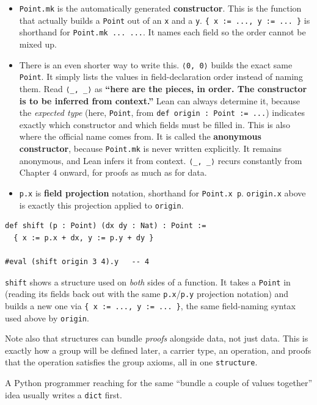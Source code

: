 \begin{itemize}
\tightlist
\item
  \texttt{Point.mk} is the automatically generated \textbf{constructor}. This is the function that actually builds a \texttt{Point} out of an \texttt{x} and a \texttt{y}. \texttt{\{ x := ..., y := ... \}} is shorthand for \texttt{Point.mk ... ...}. It names each field so the order cannot be mixed up.
\item
  There is an even shorter way to write this. \texttt{⟨0, 0⟩} builds the exact same \texttt{Point}. It simply lists the values in field-declaration order instead of naming them. Read \texttt{⟨\_\allowbreak{}, \_\allowbreak{}⟩} as \textbf{``here are the pieces, in order. The constructor is to be inferred from context.''} Lean can always determine it, because the \emph{expected type} (here, \texttt{Point}, from \texttt{def origin : Point := ...}) indicates exactly which constructor and which fields must be filled in. This is also where the official name comes from. It is called the \textbf{anonymous constructor}, because \texttt{Point.mk} is never written explicitly. It remains anonymous, and Lean infers it from context. \texttt{⟨\_\allowbreak{}, \_\allowbreak{}⟩} recurs constantly from Chapter 4 onward, for proofs as much as for data.
\item
  \texttt{p.x} is \textbf{field projection} notation, shorthand for \texttt{Point.x p}. \texttt{origin.x} above is exactly this projection applied to \texttt{origin}.
\end{itemize}

\begin{lstlisting}
def shift (p : Point) (dx dy : Nat) : Point :=
  { x := p.x + dx, y := p.y + dy }

#eval (shift origin 3 4).y   -- 4
\end{lstlisting}

\texttt{shift} shows a structure used on \emph{both} sides of a function. It takes a \texttt{Point} in (reading its fields back out with the same \texttt{p.x}/\texttt{p.y} projection notation) and builds a new one via \texttt{\{ x := ..., y := ... \}}, the same field-naming syntax used above by \texttt{origin}.

Note also that structures can bundle \emph{proofs} alongside data, not just data. This is exactly how a group will be defined later, a carrier type, an operation, and proofs that the operation satisfies the group axioms, all in one \texttt{structure}.

\begin{progcorner}

A Python programmer reaching for the same ``bundle a couple of values together'' idea usually writes a \texttt{dict} first.

\end{progcorner}


